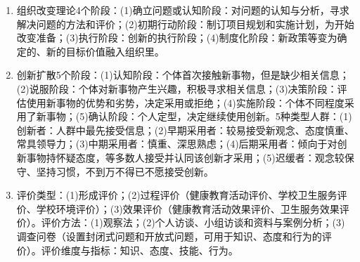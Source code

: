 \begin{enumerate}[leftmargin=*, itemsep=5pt]
    \item 组织改变理论4个阶段：(1)确立问题或认知阶段：对问题的认知与分析，寻求解决问题的方法和评价；(2)初期行动阶段：制订项目规划和实施计划，为开始改变准备；(3)执行阶段：创新的执行阶段；(4)制度化阶段：新政策等变为确定的、新的目标价值融入组织里。

    \item 创新扩散5个阶段：(1)认知阶段：个体首次接触新事物，但是缺少相关信息；(2)说服阶段：个体对新事物产生兴趣，积极寻求相关信息；(3)决策阶段：评估使用新事物的优势和劣势，决定采用或拒绝；(4)实施阶段：个体不同程度采用了新事物；(5)确认阶段：个人定型，决定继续使用创新。5种类型人群：(1)创新者：人群中最先接受信息；(2)早期采用者：较易接受新观念、态度慎重、常具领导力；(3)中期采用者：慎重、深思熟虑；(4)后期采用者：倾向于对创新事物持怀疑态度，等多数人接受并认同该创新才采用；(5)迟缓者：观念较保守、坚持习惯，不到万不得已不愿接受创新。

    \item 评价类型：(1)形成评价；(2)过程评价（健康教育活动评价、学校卫生服务评价、学校环境评价）；(3)效果评价（健康教育活动效果评价、卫生服务效果评价）。评价方法：(1)观察法；(2)个人访谈、小组访谈和资料与案例分析；(3)调查问卷（设置封闭式问题和开放式问题，可用于知识、态度和行为的评价）。评价维度与指标：知识、态度、技能、行为。
\end{enumerate}

\newpage
